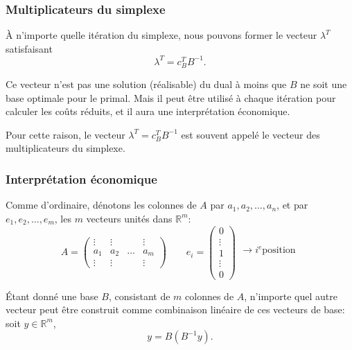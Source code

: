 \documentclass[usepdftitle=false]{beamer}
\def\RR{\mathbb{R}}
\begin{document}
\begin{frame}
	\frametitle{Multiplicateurs du simplexe}
	
	\`A n'importe quelle itération du simplexe, nous pouvons former le vecteur $\lambda^T$ satisfaisant
	\[
	\lambda^T = c_B^T B^{-1}.
	\]
	
	\mbox{}
	
	Ce vecteur n'est pas une solution (réalisable) du dual à moins que $B$ ne soit une base optimale pour le primal. Mais il peut être utilisé à chaque itération pour calculer les coûts réduits, et il aura une interprétation économique.
	
	\mbox{}
	
	Pour cette raison, le vecteur $\lambda^T = c_B^T B^{-1}$ est souvent appelé le vecteur des multiplicateurs du simplexe.
	
\end{frame}

\begin{frame}
	\frametitle{Interprétation économique}
	
	Comme d'ordinaire, dénotons les colonnes de $A$ par $a_1, a_2,\ldots, a_n$, et par $e_1, e_2,\ldots, e_m$, les $m$ vecteurs unités dans $\RR^m$:
	\[
	A = \begin{pmatrix}
		\vdots & \vdots & & \vdots \\
		a_1 & a_2 & \ldots & a_m \\
		\vdots & \vdots & & \vdots
	\end{pmatrix}
	\qquad
	e_i = \begin{pmatrix}
		0 \\
		\vdots \\
		1 \\
		\vdots \\
		0
	\end{pmatrix}
	\begin{matrix}
		\\
		\\
		\rightarrow i^e \mbox{position} \\
		\\
		\\
	\end{matrix}
	\]
	
	\mbox{}
	
	\'Etant donné une base $B$, consistant de $m$ colonnes de $A$, n'importe quel autre vecteur peut être construit comme combinaison linéaire de ces vecteurs de base: soit $y \in \RR^m$,
	\[
	y = B \left(B^{-1}y\right).
	\]
	
\end{frame}
\end{document}
